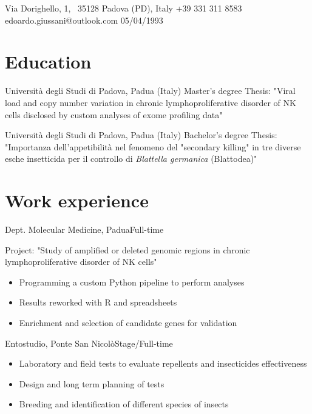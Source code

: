 \documentclass{fancy_cv}
\author{Edoardo Giussani}
\begin{document}
    {Via Dorighello, 1, \ 35128 Padova (PD), Italy}
    {+39 331 311 8583}
    {edoardo.giussani@outlook.com}
    {05/04/1993}

    \section{Education}
            {Università degli Studi di Padova, Padua (Italy)} {Master's degree}
            {Thesis: "Viral load and copy number variation in chronic 
            lymphoproliferative disorder of NK cells disclosed by custom analyses
            of exome profiling data"}
        \medskip

            {Università degli Studi di Padova, Padua (Italy)} {Bachelor's degree}
            {Thesis: "Importanza dell'appetibilità nel fenomeno del "secondary 
            killing" in tre diverse esche insetticida per il controllo
            di \textit{Blattella germanica} (Blattodea)"}


    \section{Work experience}
            {Dept. Molecular Medicine, Padua}{Full-time}
            {Project: "Study of amplified or deleted genomic regions in chronic 
            lymphoproliferative disorder of NK cells"
            \begin{itemize}
                \item Programming a custom Python pipeline to perform analyses
                \item Results reworked with R and spreadsheets
                \item Enrichment and selection of candidate genes for validation 
            \end{itemize}}
        \medskip

            {Entostudio, Ponte San Nicolò}{Stage/Full-time}
            {\begin{itemize}
                \item Laboratory and field tests to evaluate repellents and insecticides effectiveness 
                \item Design and long term planning of tests
                \item Breeding and identification of different species of insects
            \end{itemize}}
\end{document}
